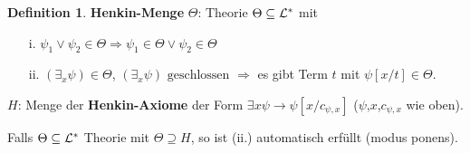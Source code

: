 \documentclass[headsepline=true,DIV=11]{scrartcl}
\theoremstyle{definition}
\newtheorem*{definition}{Definition}
\begin{document}
\begin{definition}
  {\bf Henkin-Menge} $\Theta$: Theorie $\Theta\subseteq{\cal L}^*$ mit
  \begin{itemize}
    \item[i.] $\psi_1\vee\psi_2\in\Theta\Rightarrow \psi_1\in\Theta \vee \psi_2\in\Theta$
    \item[ii.] $(\exists_{x}\psi)\in\Theta$, $(\exists_x\psi)\mbox{ geschlossen}$ $\Rightarrow$ es gibt Term $t$ mit $\psi[x/t]\in\Theta$.
  \end{itemize}
\end{definition}

$H$: Menge der {\bf Henkin-Axiome} der Form $\exists x \psi\rightarrow\psi[x/c_{\psi,x}]$ ($\psi$,$x$,$c_{\psi,x}$ wie oben).

Falls $\Theta\subseteq{\cal L}^*$ Theorie mit $\Theta\supseteq H$, so ist (ii.) automatisch erfüllt (modus ponens).
\end{document}
